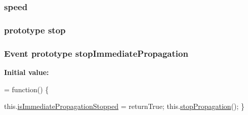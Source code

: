 \subsubsection[{speed}]{ speed}\label{jquery-1_810_82-vsdoc_8js_add98c90065e6563cba26ff6d2016c46c}
\hypertarget{jquery-1_810_82-vsdoc_8js_a15a54c91540296e335556d3209094768}{}
\subsubsection[{stop}]{ {\bf prototype} stop}\label{jquery-1_810_82-vsdoc_8js_a15a54c91540296e335556d3209094768}
\hypertarget{jquery-1_810_82-vsdoc_8js_a41ea733f6d1de22b59b62cac632d0180}{}
\subsubsection[{stop\+Immediate\+Propagation}]{ {\bf Event} {\bf prototype} stop\+Immediate\+Propagation}\label{jquery-1_810_82-vsdoc_8js_a41ea733f6d1de22b59b62cac632d0180}
{\bfseries Initial value\+:}
\begin{DoxyCode}
= \textcolor{keyword}{function}() \{


        this.\hyperlink{jquery-1_810_82-vsdoc_8js_a5fe8157d3a55c7b444e8d97b9dcde6a8}{isImmediatePropagationStopped} = returnTrue;
        this.\hyperlink{jquery-1_810_82-vsdoc_8js_ad7254bed2a2157174df61645464ed6b7}{stopPropagation}();
    \}
\end{DoxyCode}
\hypertarget{jquery-1_810_82-vsdoc_8js_ad7254bed2a2157174df61645464ed6b7}{}
